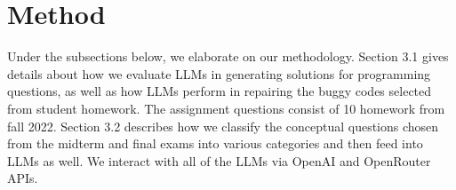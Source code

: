 \section{Method}










Under the subsections below, we elaborate on our methodology. Section 3.1 gives details about how we evaluate LLMs in generating solutions for programming questions, as well as how LLMs perform in repairing the buggy codes selected from student homework. The assignment questions consist of 10 homework from fall 2022. Section 3.2 describes how we classify the conceptual questions chosen from the midterm and final exams into various categories and then feed into LLMs as well. We interact with all of the LLMs via OpenAI and OpenRouter APIs.


